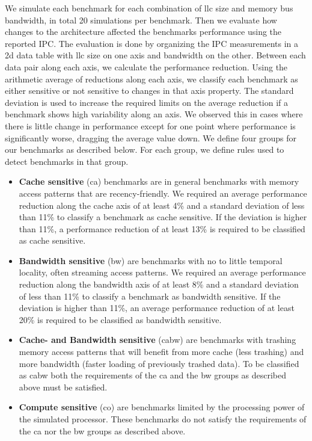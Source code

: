 We simulate each benchmark for each combination of \gls{llc} size and memory bus bandwidth, in total 20 simulations per benchmark.
Then we evaluate how changes to the architecture affected the benchmarks performance using the reported IPC.
The evaluation is done by organizing the IPC measurements in a 2d data table with \gls{llc} size on one axis and bandwidth on the other.
Between each data pair along each axis, we calculate the performance reduction.
Using the arithmetic average of reductions along each axis, we classify each benchmark as either sensitive or not sensitive to changes in that axis property.
The standard deviation is used to increase the required limits on the average reduction if a benchmark shows high variability along an axis.
We observed this in cases where there is little change in performance except for one point where performance is significantly worse, dragging the average value down.
We define four groups for our benchmarks as described below.
For each group, we define rules used to detect benchmarks in that group.
\begin{itemize}

\item \textbf{Cache sensitive} (ca) benchmarks are in general benchmarks with memory access patterns that are recency-friendly. We required an average performance reduction along the cache axis of at least 4\% and a standard deviation of less than 11\% to classify a benchmark as cache sensitive. If the deviation is higher than 11\%, a performance reduction of at least 13\% is required to be classified as cache sensitive.

\item \textbf{Bandwidth sensitive} (bw) are benchmarks with no to little temporal locality, often streaming access patterns. We required an average performance reduction along the bandwidth axis of at least 8\% and a standard deviation of less than 11\% to classify a benchmark as bandwidth sensitive. If the deviation is higher than 11\%, an average performance reduction of at least 20\% is required to be classified as bandwidth sensitive. 

\item \textbf{Cache- and Bandwidth sensitive} (cabw) are benchmarks with trashing memory access patterns that will benefit from more cache (less trashing) and more bandwidth (faster loading of previously trashed data). To be classified as cabw both the requirements of the ca and the bw groups as described above must be satisfied.

\item \textbf{Compute sensitive} (co) are benchmarks limited by the processing power of the simulated processor. These benchmarks do not satisfy the requirements of the ca nor the bw groups as described above.

\end{itemize}


